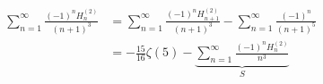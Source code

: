 \begin{align}
\sum^\infty_{n=1}\frac{(-1)^nH_n^{(2)}}{(n+1)^3}
&=\sum^\infty_{n=1}\frac{(-1)^nH_{n+1}^{(2)}}{(n+1)^3}-\sum^\infty_{n=1}\frac{(-1)^n}{(n+1)^5}\\
&=-\frac{15}{16}\zeta(5)-\underbrace{\sum^\infty_{n=1}\frac{(-1)^nH_n^{(2)}}{n^3}}_{S}
\end{align}
